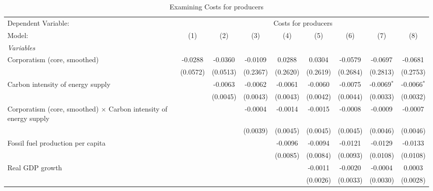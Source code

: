 
\begin{table}[htbp]
   \caption{Examining Costs for producers}
   \centering
   \begin{tabular}{lcccccccc}
      \tabularnewline \midrule \midrule
      Dependent Variable: & \multicolumn{8}{c}{Costs for producers}\\
      Model:                                                                   & (1)      & (2)      & (3)      & (4)      & (5)      & (6)      & (7)           & (8)\\  
      \midrule
      \emph{Variables}\\
      Corporatism (core, smoothed)                                             & -0.0288  & -0.0360  & -0.0109  & 0.0288   & 0.0304   & -0.0579  & -0.0697       & -0.0681\\   
                                                                               & (0.0572) & (0.0513) & (0.2367) & (0.2620) & (0.2619) & (0.2684) & (0.2813)      & (0.2753)\\   
      Carbon intensity of energy supply                                        &          & -0.0063  & -0.0062  & -0.0061  & -0.0060  & -0.0075  & -0.0069$^{*}$ & -0.0066$^{*}$\\   
                                                                               &          & (0.0045) & (0.0043) & (0.0043) & (0.0042) & (0.0044) & (0.0033)      & (0.0032)\\   
      Corporatism (core, smoothed) $\times$ Carbon intensity of energy supply  &          &          & -0.0004  & -0.0014  & -0.0015  & -0.0008  & -0.0009       & -0.0007\\   
                                                                               &          &          & (0.0039) & (0.0045) & (0.0045) & (0.0045) & (0.0046)      & (0.0046)\\   
      Fossil fuel production per capita                                        &          &          &          & -0.0096  & -0.0094  & -0.0121  & -0.0129       & -0.0133\\   
                                                                               &          &          &          & (0.0085) & (0.0084) & (0.0093) & (0.0108)      & (0.0108)\\   
      Real GDP growth                                                          &          &          &          &          & -0.0011  & -0.0020  & -0.0004       & 0.0003\\   
                                                                               &          &          &          &          & (0.0026) & (0.0033) & (0.0030)      & (0.0028)\\   

\end{tabular}
\end{table}
